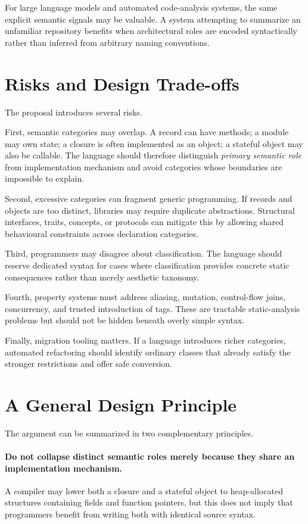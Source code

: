 \documentclass[11pt]{article}
\begin{document}
For large language models and automated code-analysis systems, the same explicit semantic signals may be valuable. A system attempting to summarize an unfamiliar repository benefits when architectural roles are encoded syntactically rather than inferred from arbitrary naming conventions.

\section{Risks and Design Trade-offs}

The proposal introduces several risks.

First, semantic categories may overlap. A record can have methods; a module may own state; a closure is often implemented as an object; a stateful object may also be callable. The language should therefore distinguish \emph{primary semantic role} from implementation mechanism and avoid categories whose boundaries are impossible to explain.

Second, excessive categories can fragment generic programming. If records and objects are too distinct, libraries may require duplicate abstractions. Structural interfaces, traits, concepts, or protocols can mitigate this by allowing shared behavioural constraints across declaration categories.

Third, programmers may disagree about classification. The language should reserve dedicated syntax for cases where classification provides concrete static consequences rather than merely aesthetic taxonomy.

Fourth, property systems must address aliasing, mutation, control-flow joins, concurrency, and trusted introduction of tags. These are tractable static-analysis problems but should not be hidden beneath overly simple syntax.

Finally, migration tooling matters. If a language introduces richer categories, automated refactoring should identify ordinary classes that already satisfy the stronger restrictions and offer safe conversion.

\section{A General Design Principle}

The argument can be summarized in two complementary principles.

\paragraph{Do not collapse distinct semantic roles merely because they share an implementation mechanism.}
A compiler may lower both a closure and a stateful object to heap-allocated structures containing fields and function pointers, but this does not imply that programmers benefit from writing both with identical source syntax.
\end{document}
